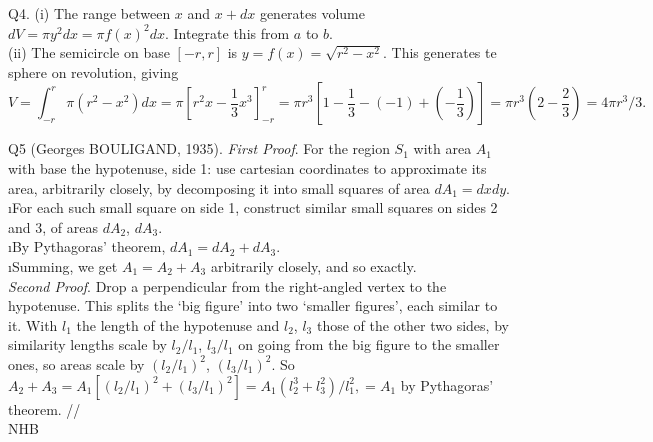 \documentclass[12pt]{article}
\begin{document}
\ni Q4. (i) The range between $x$ and $x + dx$ generates volume $dV = \pi y^2 dx = \pi f(x)^2 dx$.  Integrate this from $a$ to $b$. \\
(ii) The semicircle on base $[-r,r]$ is $y = f(x) = \sqrt{r^2 - x^2}$.  This generates te sphere on revolution, giving
$$
V = \int_{-r}^r \pi (r^2 - x^2) dx = \pi [r^2 x - \frac{1}{3} x^3]_{-r}^r = \pi r^3 [1 - \frac{1}{3} - (-1) + (- \frac{1}{3})] = \pi r^3 (2 - \frac{2}{3}) = 4 \pi r^3/3.
$$

\ni Q5  (Georges BOULIGAND, 1935).  {\it First Proof}.  For the region $S_1$ with area $A_1$ with base the hypotenuse, side 1: use cartesian coordinates to approximate its area, arbitrarily closely, by decomposing it into small squares of area
$dA_1 = dx dy$. \\
\i For each such small square on side 1, construct similar small squares on sides 2 and 3, of areas $dA_2$, $dA_3$. \\
\i By Pythagoras' theorem, $dA_1 = dA_2 + dA_3$. \\
\i Summing, we get $A_1 = A_2 + A_3$ arbitrarily closely, and so exactly. \\
{\it Second Proof}.  Drop a perpendicular from the right-angled vertex to the hypotenuse.  This splits the `big figure' into two `smaller figures', each similar to it.  With $l_1$ the length of the hypotenuse and $l_2$, $l_3$ those of the other two sides, by similarity lengths scale by $l_2/l_1$, $l_3/l_1$ on going from the big figure to the smaller ones, so areas scale by $(l_2/l_1)^2$, $(l_3/l_1)^2$.  So $A_2 + A_3 = A_1[(l_2/l_1)^2 + (l_3/l_1)^2] = A_1(l_2^3 + l_3^2)/l_1^2, = A_1$ by Pythagoras' theorem. // \\

\hfil NHB \break
\end{document}
